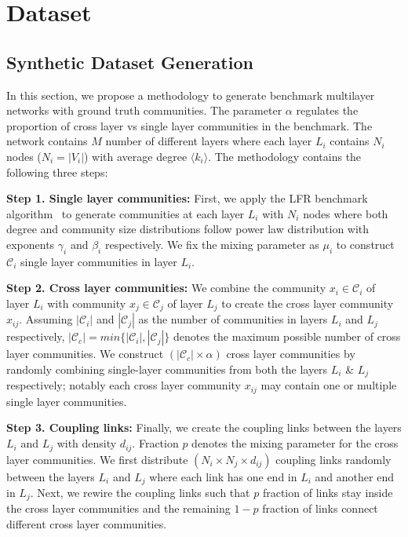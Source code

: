 \section{Dataset} \label{syn_gen_eval}
\subsection{Synthetic Dataset Generation}\label{syn_gen}
In this section, we propose a methodology to generate benchmark multilayer networks with ground truth communities.
The parameter $\alpha$ regulates the
proportion of cross layer vs single layer communities in the benchmark. The network contains $M$ number of different layers where each
layer $L_i$ contains $N_i$ nodes ($N_i = \left\vert V_i \right\vert$) with average degree $\langle k_i\rangle$.
The methodology contains the following three steps:

\textbf{Step 1. Single layer communities:} First, we apply the LFR benchmark algorithm~\cite{lancichinetti2008benchmark}
to generate communities at
each layer $L_i$ with $N_i$ nodes where both degree and community size distributions follow power law distribution
with exponents $\gamma_i$ and $\beta_i$ respectively. We fix the mixing
parameter as $\mu_i$ to construct $\mathcal{C}_i$ single layer communities in layer $L_i$.

\textbf{Step 2. Cross layer communities:} We combine the community $x_i\in \mathcal{C}_i$ of layer $L_i$ with
community $x_j\in \mathcal{C}_j$ of layer $L_j$ to create the cross layer community $x_{ij}$. Assuming
$\left\vert \mathcal{C}_i \right\vert$ and $\left\vert \mathcal{C}_j \right\vert$ as the number of communities in
layers $L_i$ and $L_j$
respectively, $\left\vert\mathcal{C}_c\right\vert=min\{\left\vert\mathcal{C}_i\right\vert, \left\vert\mathcal{C}_j\right\vert\}$ denotes
the maximum possible number
of cross layer communities. We construct $(|\mathcal{C}_c| \times \alpha)$ cross layer communities by
randomly combining single-layer communities from both the layers $L_i$ \& $L_j$ respectively; notably each
cross layer community $x_{ij}$ may contain one or multiple single layer communities.

\textbf{Step 3. Coupling links:} Finally, we create the coupling links between the layers $L_i$ and $L_j$ with
density $d_{ij}$. Fraction $p$ denotes the mixing parameter for the cross layer communities. We first
distribute  $(N_i \times N_j \times d_{ij})$ coupling links randomly between the layers $L_i$ and $L_j$ where
each link has one end in $L_i$ and another end in $L_j$. Next, we rewire the coupling links such
that $p$ fraction of links stay inside the cross layer communities and the remaining $1-p$ fraction of
links connect different cross layer communities.

